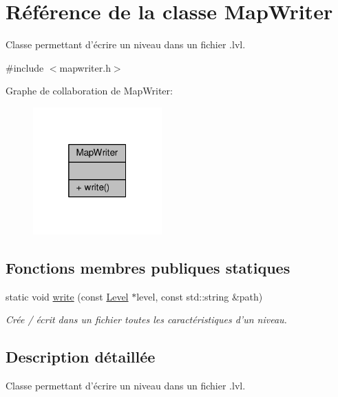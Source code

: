 \hypertarget{classMapWriter}{\section{Référence de la classe Map\+Writer}
\label{classMapWriter}
}


Classe permettant d'écrire un niveau dans un fichier .lvl.  




{\ttfamily \#include $<$mapwriter.\+h$>$}



Graphe de collaboration de Map\+Writer\+:\nopagebreak
\begin{figure}[H]
\begin{center}
\leavevmode
\includegraphics[width=140pt]{df/d0c/classMapWriter__coll__graph}
\end{center}
\end{figure}
\subsection*{Fonctions membres publiques statiques}
\begin{DoxyCompactItemize}
\item 
static void \hyperlink{classMapWriter_a39b4a6bb724070674f8dc2014b2f165a}{write} (const \hyperlink{classLevel}{Level} $\ast$level, const std\+::string \&path)
\begin{DoxyCompactList}\small\item\em Crée / écrit dans un fichier toutes les caractéristiques d'un niveau. \end{DoxyCompactList}\end{DoxyCompactItemize}


\subsection{Description détaillée}
Classe permettant d'écrire un niveau dans un fichier .lvl. 

